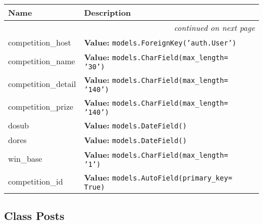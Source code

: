     \vspace{-1cm}
\hspace{\varindent}\begin{longtable}{|p{\varnamewidth}|p{\vardescrwidth}|l}
\cline{1-2}
\cline{1-2} \centering \textbf{Name} & \centering \textbf{Description}& \\
\cline{1-2}
\endhead\cline{1-2}\multicolumn{3}{r}{\small\textit{continued on next page}}\\\endfoot\cline{1-2}
\endlastfoot\raggedright c\-o\-m\-p\-e\-t\-i\-t\-i\-o\-n\-\_\-h\-o\-s\-t\- & \raggedright \textbf{Value:} 
{\tt models.ForeignKey('auth.User')}&\\
\cline{1-2}
\raggedright c\-o\-m\-p\-e\-t\-i\-t\-i\-o\-n\-\_\-n\-a\-m\-e\- & \raggedright \textbf{Value:} 
{\tt models.CharField(max\_length= '30')}&\\
\cline{1-2}
\raggedright c\-o\-m\-p\-e\-t\-i\-t\-i\-o\-n\-\_\-d\-e\-t\-a\-i\-l\- & \raggedright \textbf{Value:} 
{\tt models.CharField(max\_length= '140')}&\\
\cline{1-2}
\raggedright c\-o\-m\-p\-e\-t\-i\-t\-i\-o\-n\-\_\-p\-r\-i\-z\-e\- & \raggedright \textbf{Value:} 
{\tt models.CharField(max\_length= '140')}&\\
\cline{1-2}
\raggedright d\-o\-s\-u\-b\- & \raggedright \textbf{Value:} 
{\tt models.DateField()}&\\
\cline{1-2}
\raggedright d\-o\-r\-e\-s\- & \raggedright \textbf{Value:} 
{\tt models.DateField()}&\\
\cline{1-2}
\raggedright w\-i\-n\-\_\-b\-a\-s\-e\- & \raggedright \textbf{Value:} 
{\tt models.CharField(max\_length= '1')}&\\
\cline{1-2}
\raggedright c\-o\-m\-p\-e\-t\-i\-t\-i\-o\-n\-\_\-i\-d\- & \raggedright \textbf{Value:} 
{\tt models.AutoField(primary\_key= True)}&\\
\cline{1-2}
\end{longtable}



\subsection{Class Posts}


